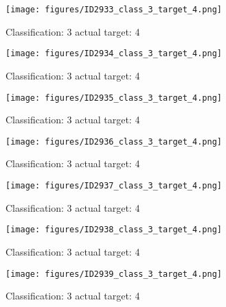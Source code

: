 \begin{figure}[h!]
\begin{center}
\texttt{[image: figures/ID2933\_class\_3\_target\_4.png]}
\end{center}
\caption{ Classification: 3 actual target: 4}
\label{fig:ID2933_class_3_target_4}
\end{figure}
\begin{figure}[h!]
\begin{center}
\texttt{[image: figures/ID2934\_class\_3\_target\_4.png]}
\end{center}
\caption{ Classification: 3 actual target: 4}
\label{fig:ID2934_class_3_target_4}
\end{figure}
\begin{figure}[h!]
\begin{center}
\texttt{[image: figures/ID2935\_class\_3\_target\_4.png]}
\end{center}
\caption{ Classification: 3 actual target: 4}
\label{fig:ID2935_class_3_target_4}
\end{figure}
\begin{figure}[h!]
\begin{center}
\texttt{[image: figures/ID2936\_class\_3\_target\_4.png]}
\end{center}
\caption{ Classification: 3 actual target: 4}
\label{fig:ID2936_class_3_target_4}
\end{figure}
\begin{figure}[h!]
\begin{center}
\texttt{[image: figures/ID2937\_class\_3\_target\_4.png]}
\end{center}
\caption{ Classification: 3 actual target: 4}
\label{fig:ID2937_class_3_target_4}
\end{figure}
\begin{figure}[h!]
\begin{center}
\texttt{[image: figures/ID2938\_class\_3\_target\_4.png]}
\end{center}
\caption{ Classification: 3 actual target: 4}
\label{fig:ID2938_class_3_target_4}
\end{figure}
\begin{figure}[h!]
\begin{center}
\texttt{[image: figures/ID2939\_class\_3\_target\_4.png]}
\end{center}
\caption{ Classification: 3 actual target: 4}
\label{fig:ID2939_class_3_target_4}
\end{figure}
